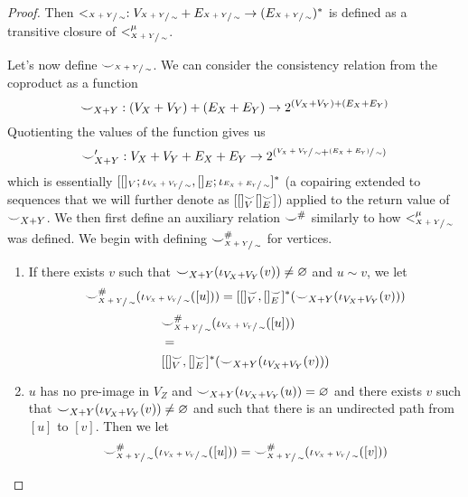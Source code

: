 \begin{proof}
    Then $<_{\sfrac{X+Y}{\sim}} : V_{\sfrac{X+Y}{\sim}} + E_{\sfrac{X+Y}{\sim}} \to (E_{\sfrac{X+Y}{\sim}})^{*}$ is defined as a transitive closure of $<_{\sfrac{X+Y}{\sim}}^{\mu}$.
        
    Let's now define ${\smile}_{\sfrac{X+Y}{\sim}}$.
    We can consider the consistency relation from the coproduct as a function 
    \[
        {\smile}_{X+Y} : (V_{X} + V_{Y}) + (E_{X} + E_{Y}) \to 2^{(V_{X} + V_{Y}) + (E_{X} + E_{Y})}
    \]
    Quotienting the values of the function gives us 
    \[
        {\smile}_{X+Y}' : V_{X} + V_{Y} + E_{X} + E_{Y} \to 2^{(\sfrac{V_{X} + V_{Y}}{\sim} + \sfrac{(E_{X} + E_{Y})}{\sim})}
     \]
    which is essentially $[ []_{V};\iota_{\sfrac{V_{X} + V_{Y}}{\sim}}, []_{E};\iota_{\sfrac{E_{X} + E_{Y}}{\sim}}]^{*}$ (a copairing extended to sequences that we will further denote as $[ []_{V}^{{\smile}} []_{E}^{{\smile}}]$) applied to the return value of ${\smile}_{X+Y}$.
    We then first define an auxiliary relation ${\smile}^{{\#}}$ similarly to how $<^{\mu}_{\sfrac{X+Y}{\sim}}$ was defined. We begin with defining ${\smile}^{{\#}}_{\sfrac{X+Y}{\sim}}$ for vertices.

    \begin{enumerate}
        \item If there exists $v$ such that ${\smile}_{X+Y}(\iota_{V_{X} + V_{Y}}(v)) \not = \varnothing$ and $u \sim v$, we let
              \ifdefined \ONECOLUMN
              \[
                {\smile}_{\sfrac{X+Y}{\sim}}^{{\#}}(\iota_{\sfrac{V_{X} + V_{Y}}{\sim}}([u]))
                =
                [[]_{V}^{{\smile}},[]_{E}^{{\smile}}]^{*}({\smile}_{X+Y}(\iota_{V_{X} + V_{Y}}(v)))
              \]
              \else
              \begin{align*}
                &{\smile}_{\sfrac{X+Y}{\sim}}^{{\#}}(\iota_{\sfrac{V_{X} + V_{Y}}{\sim}}([u]))\\
                &=\\
                &[[]_{V}^{{\smile}},[]_{E}^{{\smile}}]^{*}({\smile}_{X+Y}(\iota_{V_{X} + V_{Y}}(v)))
            \end{align*}
            \fi
        \item $u$ has no pre-image in $V_{Z}$ and ${\smile}_{X+Y}(\iota_{V_{X} + V_{Y}}(u)) = \varnothing$ and there exists $v$ such that ${\smile}_{X+Y}(\iota_{V_{X} + V_{Y}}(v)) \not = \varnothing$ and such that there is an undirected path from $[u]$ to $[v]$.
        Then we let
        \[
            {\smile}_{\sfrac{X+Y}{\sim}}^{{\#}}(\iota_{\sfrac{V_{X} + V_{Y}}{\sim}}([u])) = {\smile}_{\sfrac{X+Y}{\sim}}^{{\#}}(\iota_{\sfrac{V_{X} + V_{Y}}{\sim}}([v]))
        \]
    \end{enumerate}


\end{proof}
